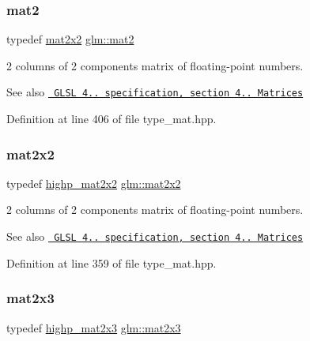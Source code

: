 \subsubsection{\texorpdfstring{mat2}{mat2}}
{\footnotesize\ttfamily typedef \mbox{\hyperlink{group__core__types_gaeddc14adb4963d9bad73866cc202fb40}{mat2x2}} \mbox{\hyperlink{group__core__types_ga8357ec0aab6f8cf69313592492663c3f}{glm\+::mat2}}}

2 columns of 2 components matrix of floating-\/point numbers.

\begin{DoxySeeAlso}{See also}
\href{http://www.opengl.org/registry/doc/GLSLangSpec.4.20.8.pdf}{\texttt{ G\+L\+SL 4.. specification, section 4.. Matrices}} 
\end{DoxySeeAlso}


Definition at line 406 of file type\+\_\+mat.\+hpp.

\mbox{\label{group__core__types_gaeddc14adb4963d9bad73866cc202fb40}} 
\subsubsection{\texorpdfstring{mat2x2}{mat2x2}}
{\footnotesize\ttfamily typedef \mbox{\hyperlink{group__core__precision_ga20b66861ebdfa14586f4028c5ef16d2e}{highp\+\_\+mat2x2}} \mbox{\hyperlink{group__core__types_gaeddc14adb4963d9bad73866cc202fb40}{glm\+::mat2x2}}}

2 columns of 2 components matrix of floating-\/point numbers.

\begin{DoxySeeAlso}{See also}
\href{http://www.opengl.org/registry/doc/GLSLangSpec.4.20.8.pdf}{\texttt{ G\+L\+SL 4.. specification, section 4.. Matrices}} 
\end{DoxySeeAlso}


Definition at line 359 of file type\+\_\+mat.\+hpp.

\mbox{\label{group__core__types_gaea02797b8231f6dd9380345f6ff12155}} 
\subsubsection{\texorpdfstring{mat2x3}{mat2x3}}
{\footnotesize\ttfamily typedef \mbox{\hyperlink{group__core__precision_ga96ec9c154598fcc1c113d9ebd3680097}{highp\+\_\+mat2x3}} \mbox{\hyperlink{group__core__types_gaea02797b8231f6dd9380345f6ff12155}{glm\+::mat2x3}}}

